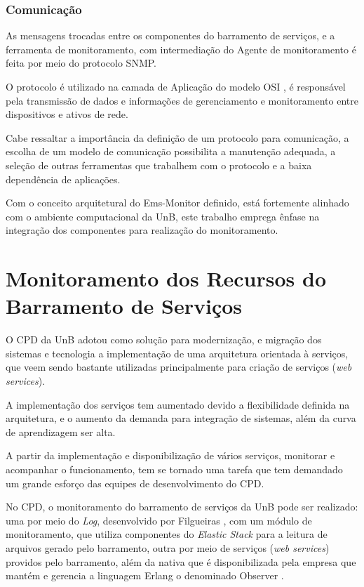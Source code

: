 \subsubsection{Comunicação}

As mensagens trocadas entre os componentes do barramento de serviços, e a ferramenta de monitoramento, com intermediação do Agente de monitoramento é feita por meio do protocolo \acrshort{SNMP}. 

O protocolo é utilizado na camada de Aplicação do modelo OSI \cite{tanenbaum2003redes}, é responsável pela transmissão de dados e informações de gerenciamento e monitoramento entre dispositivos e ativos de rede. 

Cabe ressaltar a importância da definição de um protocolo para comunicação, a escolha de um modelo de comunicação possibilita a manutenção adequada, a seleção de outras ferramentas que trabalhem com o protocolo e a baixa dependência de aplicações.     

Com o conceito arquitetural do Ems-Monitor definido, está fortemente alinhado com o ambiente computacional da \acrshort{UnB}, este trabalho emprega ênfase na integração dos componentes para realização do monitoramento.   

\section{Monitoramento dos Recursos do Barramento de Serviços}%
\label{recursos_monitoramento}

O \acrshort{CPD} da \acrshort{UnB} adotou como solução para modernização, e migração dos sistemas e tecnologia a implementação de uma arquitetura orientada à serviços, que veem sendo bastante utilizadas principalmente para criação de serviços (\textit{web services}). 

A implementação dos serviços tem aumentado devido a flexibilidade definida na arquitetura, e o aumento da demanda para integração de sistemas, além da curva de aprendizagem ser alta. 

A partir da implementação e disponibilização de  vários serviços, monitorar e acompanhar o funcionamento, tem se tornado uma tarefa que tem demandado um grande esforço das equipes de desenvolvimento do \acrshort{CPD}. 

No \acrshort{CPD}, o monitoramento do barramento de serviços da \acrshort{UnB} pode ser realizado: uma por meio do \textit{Log}, desenvolvido por Filgueiras \cite{filgueirasmonitoramento}, com um módulo de monitoramento, que utiliza componentes do \textit{Elastic Stack} para a leitura de arquivos gerado pelo barramento, outra por meio de serviços (\textit{web services}) providos pelo barramento, além da nativa que é disponibilizada pela empresa que mantém e gerencia a linguagem Erlang o denominado Observer \cite{ericssonAB2002-2019}.

